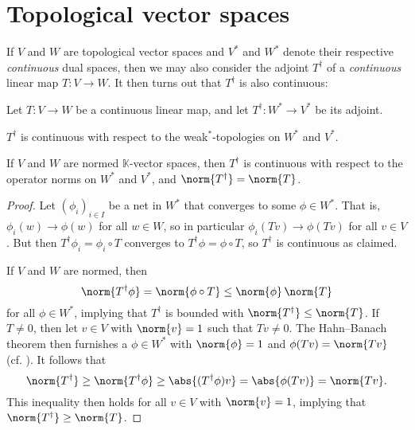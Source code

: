 \documentclass[article, a4paper, 11pt, oneside]{memoir}
\numberwithin{equation}{chapter}
\begin{document}
\section{Topological vector spaces}

If $V$ and $W$ are topological vector spaces and $V^*$ and $W^*$ denote their respective \emph{continuous} dual spaces, then we may also consider the adjoint $T^\dagger$ of a \emph{continuous} linear map $T \colon V \to W$. It then turns out that $T^\dagger$ is also continuous:

\begin{proposition}
    Let $T \colon V \to W$ be a continuous linear map, and let $T^\dagger \colon W^* \to V^*$ be its adjoint.
    \begin{enumprop}
        \item $T^\dagger$ is continuous with respect to the weak$^*$-topologies on $W^*$ and $V^*$.

        \item \label{enum:operator-adjoint-continuous-normed} If $V$ and $W$ are normed $\mathbb{K}$-vector spaces, then $T^\dagger$ is continuous with respect to the operator norms on $W^*$ and $V^*$, and $\norm{T^\dagger} = \norm{T}$.
    \end{enumprop}
\end{proposition}

\begin{proof}
    Let $(\phi_i)_{i \in I}$ be a net in $W^*$ that converges to some $\phi \in W^*$. That is, $\phi_i(w) \to \phi(w)$ for all $w \in W$, so in particular $\phi_i(Tv) \to \phi(Tv)$ for all $v \in V$. But then $T^\dagger \phi_i = \phi_i \circ T$ converges to $T^\dagger \phi = \phi \circ T$, so $T^\dagger$ is continuous as claimed.

    If $V$ and $W$ are normed, then
    \begin{equation*}
        \norm{T^\dagger \phi}
            = \norm{\phi \circ T}
            \leq \norm{\phi} \, \norm{T}
    \end{equation*}
    for all $\phi \in W^*$, implying that $T^\dagger$ is bounded with $\norm{T^\dagger} \leq \norm{T}$. If $T \neq 0$, then let $v \in V$ with $\norm{v} = 1$ such that $Tv \neq 0$. The Hahn--Banach theorem then furnishes a $\phi \in W^*$ with $\norm{\phi} = 1$ and $\phi(Tv) = \norm{Tv}$ (cf. \cite[Theorem~5.8(b)]{follandrealanalysis}). It follows that
    \begin{equation*}
        \norm{T^\dagger}
            \geq \norm{T^\dagger \phi}
            \geq \abs{(T^\dagger \phi)v}
            = \abs{\phi(Tv)}
            = \norm{Tv}.
    \end{equation*}
    This inequality then holds for all $v \in V$ with $\norm{v} = 1$, implying that $\norm{T^\dagger} \geq \norm{T}$.
\end{proof}
\end{document}

